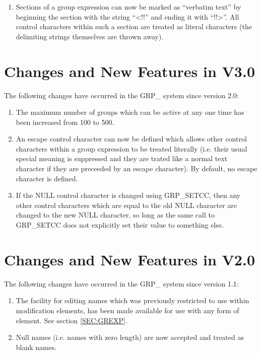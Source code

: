 \begin{enumerate}

\item Sections of a group expression can now be marked as ``verbatim text''
by beginning the section with the string ``<!!'' and ending it with
``!!>''. All control characters within such a section are treated as
literal characters (the delimiting strings themselves are thrown away).
\end{enumerate}

\section{Changes and New Features in V3.0}
The following changes have occurred in the GRP\_ system since version 2.0:

\begin{enumerate}

\item The maximum number of groups which can be active at any one time
has been increased from 100 to 500.

\item An escape control character can now be defined which allows other
control characters within a group expression to be treated literally 
(i.e. their usual special meaning is suppressed and they are trated like a 
normal text character if they are preceeded by an escape character). By 
default, no escape character is defined.

\item If the NULL control character is changed using GRP\_SETCC, then any
other control characters which are equal to the old NULL character are
changed to the new NULL character, so long as the same call to GRP\_SETCC
does not explicitly set their value to something else.

\end{enumerate}

\section{Changes and New Features in V2.0}
The following changes have occurred in the GRP\_ system since version 1.1:
\begin{enumerate}
\item The facility for editing names which was previously restricted to use
within modification elements, has been made available for use with any form
of element. See section \ref{SEC:GREXP}.
\item Null names (i.e. names with zero length) are now accepted and treated as
blank names.
\end{enumerate}

